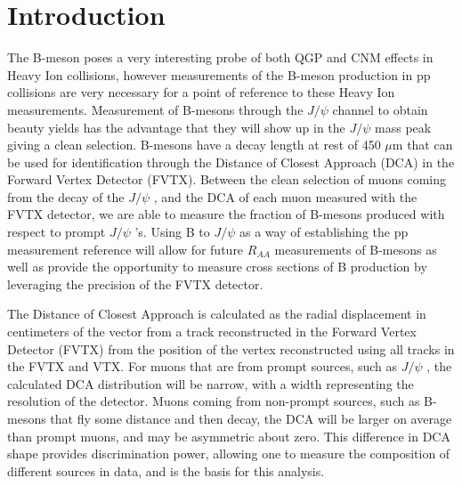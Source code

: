 \documentclass[12pt]{article}
\newcommand{\pt}{$P_{t}$ }
\newcommand{\jpsi}{$J/\psi$ }
\begin{document}
\tableofcontents

\newpage

\section{Introduction}

The B-meson poses a very interesting probe of both QGP and CNM effects in Heavy Ion collisions, however measurements of the B-meson production in pp collisions 
are very necessary for a point of reference to these Heavy Ion measurements. 
Measurement of B-mesons through the \jpsi channel to obtain beauty yields has the advantage that they will show up in the \jpsi mass peak giving a clean selection.
B-mesons have a decay length at rest of 450 $\mu$m that can be used for identification through the Distance of Closest Approach (DCA) in the Forward Vertex Detector (FVTX). 
Between the clean selection of muons coming from the decay of the \jpsi, and the DCA of each muon measured with the FVTX detector, we are able to measure the fraction of 
B-mesons produced with respect to prompt \jpsi's. Using B to \jpsi as a way of establishing the pp measurement reference will allow for future $R_{AA}$ measurements 
of B-mesons as well as provide the opportunity to measure cross sections of B production by leveraging the precision of the FVTX detector.

The Distance of Closest Approach is calculated as the radial displacement in centimeters
of the vector from a track reconstructed in the Forward Vertex Detector (FVTX) from the position of the 
vertex reconstructed using all tracks in the FVTX and VTX.  For muons that are from prompt sources,
such as \jpsi, the calculated DCA distribution will be narrow, with a width representing the resolution of the 
detector.  Muons coming from non-prompt sources, such as B-mesons that fly some distance and then decay,
the DCA will be larger on average than prompt muons, and may be asymmetric about zero.  This difference in
DCA shape provides discrimination power, allowing one to measure the composition of different sources in data,
and is the basis for this analysis.

\end{document}
